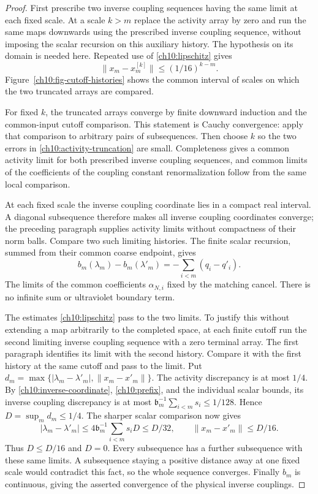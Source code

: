 \begin{proof}
First prescribe two inverse coupling sequences having the same limit at each
fixed scale. At a scale $k>m$ replace the activity array by zero and
run the same maps downwards using the prescribed inverse coupling sequence, without
imposing the scalar recursion on this auxiliary history. The
hypothesis on its domain is needed here. Repeated use of
\eqref{ch10:lipschitz} gives
\begin{equation}\label{ch10:activity-truncation}
 \|x_m-x_m^{[k]}\|\le(1/16)^{k-m}.
\end{equation}
Figure~\ref{ch10:fig-cutoff-histories} shows the common interval
of scales on which the two truncated arrays are compared.



For fixed $k$, the truncated arrays converge by finite downward
induction and the common-input cutoff comparison. This statement
is Cauchy convergence: apply that comparison to arbitrary pairs of
subsequences. Then choose $k$ so the two errors in
\eqref{ch10:activity-truncation} are small. Completeness gives a
common activity limit for both prescribed inverse coupling sequences, and common limits of the coefficients of the coupling constant
renormalization follow from the same local comparison.

At each fixed scale the inverse coupling coordinate lies in a compact real
interval. A diagonal subsequence therefore makes all inverse coupling
coordinates converge; the preceding paragraph supplies activity
limits without compactness of their norm balls. Compare two such
limiting histories. The finite scalar recursion, summed from their
common coarse endpoint, gives
\begin{equation}\label{ch10:prefix}
 b_m(\lambda_m)-b_m(\lambda'_m)
                 =-\sum_{i<m}(q_i-q'_i).
\end{equation}
The limits of the common coefficients $\alpha_{N,i}$ fixed by the matching cancel.
There is no infinite sum or ultraviolet boundary term.

The estimates \eqref{ch10:lipschitz} pass to the two limits. To
justify this without extending a map arbitrarily to the completed
space, at each finite cutoff run the second limiting inverse coupling sequence
with a zero terminal array. The first paragraph identifies its limit
with the second history. Compare it with the first history at the
same cutoff and pass to the limit.
Put
$d_m=\max\{|\lambda_m-\lambda'_m|,\|x_m-x'_m\|\}$.
The activity discrepancy is at most $1/4$. By
\eqref{ch10:inverse-coordinate}, \eqref{ch10:prefix}, and the
individual scalar bounds, its inverse coupling discrepancy is at most
$\mathfrak b_m^{-1}\sum_{i<m}s_i\le1/128$. Hence
$D=\sup_m d_m\le1/4$. The sharper scalar comparison now gives
\[
 |\lambda_m-\lambda'_m|
 \le4\mathfrak b_m^{-1}\sum_{i<m}s_iD\le D/32,
 \qquad \|x_m-x'_m\|\le D/16.
\]
Thus $D\le D/16$ and $D=0$. Every subsequence has a further
subsequence with these same limits. A subsequence staying a positive
distance away at one fixed scale would contradict this fact, so the
whole sequence converges. Finally $b_m$ is continuous, giving the
asserted convergence of the physical inverse couplings.
\end{proof}

